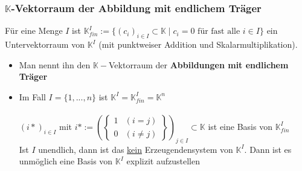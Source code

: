 \documentclass[titlepage]{article}
\newcommand{\K}{\mathbb{K}}
\newcommand{\1}{\mathbb{1}}
\newcommand{\0}{\mathbb{0}}
\begin{document}
				\subsubsection{$\mathbb{K}$-Vektorraum der Abbildung mit endlichem Träger}
					Für eine Menge $I$ ist $\K^I_{fin}:=\{(c_i)_{i\in I}\subset\K\mid c_i=0\text{ für fast alle }i\in I\}$ ein Untervektorraum von $\K^I$ (mit punktweiser Addition und Skalarmultiplikation).
					\begin{itemize}
						\item Man nennt ihn den $\K-$Vektorraum der \textbf{Abbildungen mit endlichem Träger}
						\item Im Fall $I=\{1,...,n\}$ ist $\K^I=\K^I_{fin}=\K^n$\\\\
						$(i*)_{i\in I}$ mit $i*:=\left(\left\{\begin{matrix}
							1&(i=j)\\
							0&(i\neq j)
						\end{matrix}\right\}\right)_{j\in I}\subset\K$ ist eine Basis von $\K^I_{fin}$
						\\Ist $I$ unendlich, dann ist das \underline{kein} Erzeugendensystem von $\K^I$. Dann ist es unmöglich eine Basis von $\K^I$ explizit aufzustellen
					\end{itemize}
\end{document}
